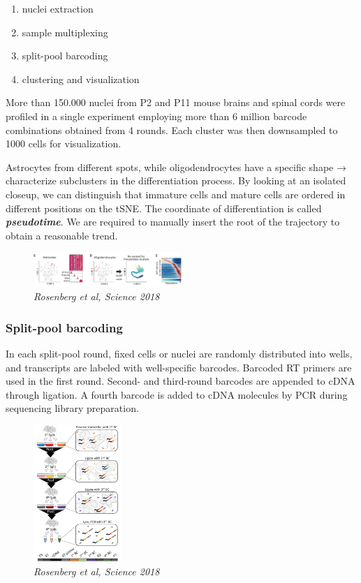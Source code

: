 \begin{enumerate}
\def\labelenumi{\arabic{enumi}.}
\tightlist
\item
  nuclei extraction
\item
  sample multiplexing
\item
  split-pool barcoding
\item
  clustering and visualization
\end{enumerate}

More than 150.000 nuclei from P2 and P11 mouse brains and spinal cords
were profiled in a single experiment employing more than 6 million
barcode combinations obtained from 4 rounds. Each cluster was then
downsampled to 1000 cells for visualization.

Astrocytes from different spots, while oligodendrocytes have a specific
shape → characterize subclusters in the differentiation process. By
looking at an isolated closeup, we can distinguish that immature cells
and mature cells are ordered in different positions on the tSNE. The
coordinate of differentiation is called \textbf{\emph{pseudotime}}. We
are required to manually insert the root of the trajectory to obtain a
reasonable trend.

\begin{figure}
\centering
\includegraphics[width=0.5\textwidth]{images/Screenshot_2023-03-24_at_08-21-13.png}
\caption{\emph{Rosenberg et al, Science 2018}}
\end{figure}


\hypertarget{split-pool-barcoding}{%
\subsubsection{Split-pool barcoding}\label{split-pool-barcoding}}

In each split-pool round, fixed cells or nuclei are randomly distributed
into wells, and transcripts are labeled with well-specific barcodes.
Barcoded RT primers are used in the first round. Second- and third-round
barcodes are appended to cDNA through ligation. A fourth barcode is
added to cDNA molecules by PCR during sequencing library preparation.

\begin{figure}
\centering
\includegraphics[width=0.3\textwidth]{images/Screenshot_2023-03-24_at_08-04-47.png}
\caption{\emph{Rosenberg et al, Science 2018}}
\end{figure}


